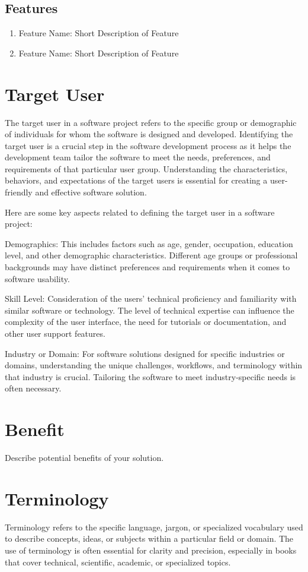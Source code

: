 \subsection{Features}
\label{subsection:features}

\begin{enumerate}[leftmargin=80pt]
    \item Feature Name: Short Description of Feature
    \item Feature Name: Short Description of Feature
\end{enumerate}

\section{Target User}
\label{section:target-user}

The target user in a software project refers to the specific
group or demographic of individuals for whom the software is designed and
developed. Identifying the target user is a crucial step in the software
development process as it helps the development team tailor the software to
meet the needs, preferences, and requirements of that particular user group.
Understanding the characteristics, behaviors, and expectations of the target
users is essential for creating a user-friendly and effective software solution.

Here are some key aspects related to defining the target user in a software project:

Demographics: This includes factors such as age, gender,
occupation, education level, and other demographic characteristics. Different
age groups or professional backgrounds may have distinct preferences and
requirements when it comes to software usability.

Skill Level: Consideration of the users' technical proficiency and
familiarity with similar software or technology. The level of technical expertise
can influence the complexity of the user interface, the need for tutorials or
documentation, and other user support features.

Industry or Domain: For software solutions designed for specific
industries or domains, understanding the unique challenges, workflows, and
terminology within that industry is crucial. Tailoring the software to meet
industry-specific needs is often necessary.

\section{Benefit}
\label{section:benefit}

Describe potential benefits of your solution.

\section{Terminology}
\label{section:terminology}

Terminology refers to the specific language, jargon, or
specialized vocabulary used to describe concepts, ideas, or subjects within a
particular field or domain. The use of terminology is often essential for clarity
and precision, especially in books that cover technical, scientific, academic, or
specialized topics.